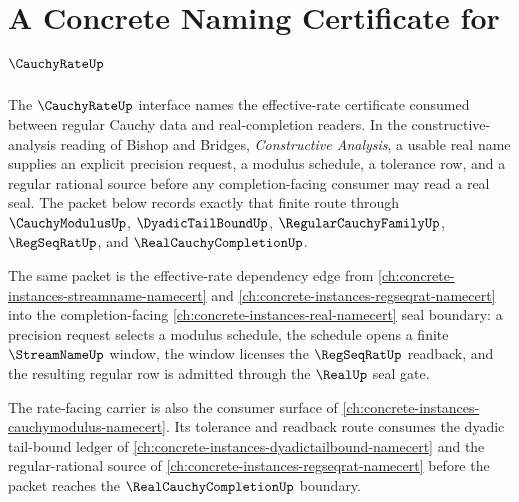 \chapter{A Concrete Naming Certificate for $\CauchyRateUp$}
\label{ch:concrete-instances-cauchyrate-namecert}

The $\CauchyRateUp$ interface names the effective-rate certificate consumed between regular Cauchy data and real-completion readers. In the constructive-analysis reading of Bishop and Bridges, \emph{Constructive Analysis}, a usable real name supplies an explicit precision request, a modulus schedule, a tolerance row, and a regular rational source before any completion-facing consumer may read a real seal. The packet below records exactly that finite route through $\CauchyModulusUp$, $\DyadicTailBoundUp$, $\RegularCauchyFamilyUp$, $\RegSeqRatUp$, and $\RealCauchyCompletionUp$.

The same packet is the effective-rate dependency edge from \autoref{ch:concrete-instances-streamname-namecert} and \autoref{ch:concrete-instances-regseqrat-namecert} into the completion-facing \autoref{ch:concrete-instances-real-namecert} seal boundary: a precision request selects a modulus schedule, the schedule opens a finite $\StreamNameUp$ window, the window licenses the $\RegSeqRatUp$ readback, and the resulting regular row is admitted through the $\RealUp$ seal gate.

The rate-facing carrier is also the consumer surface of \autoref{ch:concrete-instances-cauchymodulus-namecert}. Its tolerance and readback route consumes the dyadic tail-bound ledger of \autoref{ch:concrete-instances-dyadictailbound-namecert} and the regular-rational source of \autoref{ch:concrete-instances-regseqrat-namecert} before the packet reaches the $\RealCauchyCompletionUp$ boundary.

